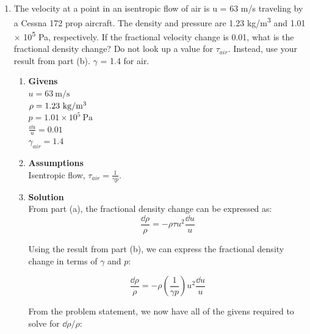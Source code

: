 \documentclass[12pt,letterpaper]{article}
\begin{document}
\begin{enumerate}[label=(\alph*)]
\begin{enumerate}[label=\arabic*.]
			\end{enumerate}

		\item The velocity at a point in an isentropic flow of air is u = 63 m/s traveling by a Cessna
		172 prop aircraft. The density and pressure are 1.23 kg/m\textsuperscript{3} and 1.01 $\times$ 10\textsuperscript{5} Pa, respectively.
		If the fractional velocity change is 0.01, what is the fractional density change? Do not look
		up a value for $\tau_{air}$. Instead, use your result from part (b). $\gamma$ = 1.4 for air.
		
		\begin{enumerate}[label=\arabic*.]
			
			\item{\textbf{Givens}} \\
			$u = 63 \ \mathrm{m/s}$\\
			$\rho = 1.23 \ \mathrm{kg/m\textsuperscript{3}}$\\
			$p = 1.01 \times 10^5 \  \mathrm{Pa}$\\
			$\frac{\dd u}{u} = 0.01$\\
			$\gamma_{air} = 1.4$\\		


			\item{\textbf{Assumptions}} \\
			Isentropic flow, $\tau_{air} = \frac{1}{\gamma p}$.


			\item{\textbf{Solution}} \\
			
			From part (a), the fractional density change can be expressed as:
			\begin{equation*}
				\frac{\dd \rho}{\rho} = - \rho \tau u^2 \frac{\dd u}{u}
			\end{equation*}
		
			Using the result from part (b), we can express the fractional density change in terms of $\gamma$ and $p$:
			
			\begin{equation*}
				\frac{\dd \rho}{\rho} = - \rho \left( \frac{1}{\gamma p} \right) u^2 \frac{\dd u}{u}
			\end{equation*}
			
			From the problem statement, we now have all of the givens required to solve for $\dd \rho / \rho$:
			

\end{enumerate}
\end{enumerate}
\end{document}

